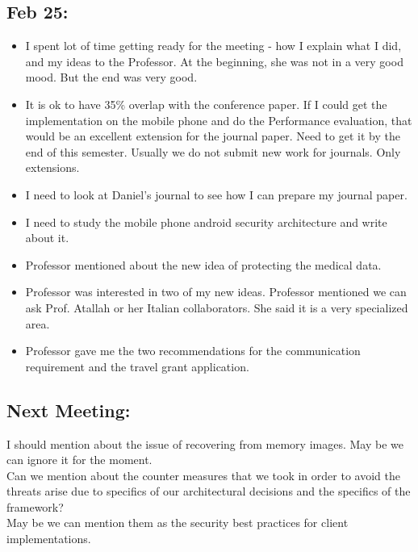 \documentclass[11pt]{article}
\begin{document}
\subsection*{Feb 25:}
\begin{itemize}
 \item I spent lot of time getting ready for the meeting - how I explain what I did, and my ideas to the Professor. At the beginning, she was not in 
a very good mood. But the end was very good.
\item It is ok to have 35\% overlap with the conference paper. If I could get the implementation on the mobile phone and do the Performance 
evaluation, that would be an excellent extension for the journal paper. Need to get it by the end of this semester. Usually we do not submit new work 
for journals. Only extensions.
\item I need to look at Daniel's journal to see how I can prepare my journal paper.
\item I need to study the mobile phone android security architecture and write about it.
\item Professor mentioned about the new idea of protecting the medical data.
\item Professor was interested in two of my new ideas. Professor mentioned we can ask Prof. Atallah or her Italian collaborators. She said it is a 
very specialized area.
\item Professor gave me the two recommendations for the communication requirement and the travel grant application.
\end{itemize}

\subsection*{Next Meeting:}
I should mention about the issue of recovering from memory images. May be we can ignore it for the moment.\\
Can we mention about the counter measures that we took in order to avoid the threats arise due to specifics of our architectural decisions and the 
specifics of the framework?\\
May be we can mention them as the security best practices for client implementations.
\end{document}
